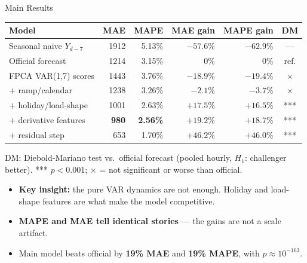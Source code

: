 \documentclass[10pt,aspectratio=169]{beamer}
\begin{document}

\begin{frame}{Main Results}

  \begin{center}
  \small
  \begin{tabular}{p{}rrrrc}
    \toprule
    Model & MAE & MAPE & MAE gain & MAPE gain & DM \\
    \midrule
    Seasonal naive $Y_{d-7}$ & 1912 & 5.13\% & $-57.6\%$ & $-62.9\%$ & --- \\
    Official forecast          & 1214 & 3.15\% & 0\%       & 0\%       & ref. \\
    \midrule
    FPCA VAR(1,7) scores       & 1443 & 3.76\% & $-18.9\%$ & $-19.4\%$ & $\times$ \\
    $+$ ramp/calendar          & 1238 & 3.26\% & $-2.1\%$  & $-3.7\%$  & $\times$ \\
    $+$ holiday/load-shape     & 1001 & 2.63\% & $+17.5\%$ & $+16.5\%$ & *** \\
    $+$ derivative features    & \textbf{980}  & \textbf{2.56\%} &
                                 $+19.2\%$ & $+18.7\%$ & *** \\
    \midrule
    $+$ residual step          & 653 & 1.70\% & $+46.2\%$ & $+46.0\%$ & *** \\
    \bottomrule
  \end{tabular}
  \end{center}

  \vspace{0.3em}
  \footnotesize
  DM: Diebold-Mariano test vs.\ official forecast (pooled hourly, $H_1$: challenger better).
  *** $p < 0.001$; $\times$ = not significant or worse than official.

  \vspace{0.3em}
  \begin{itemize}
    \item \textbf{Key insight:} the pure VAR dynamics are not enough.
      Holiday and load-shape features are what make the model competitive.
    \item \textbf{MAPE and MAE tell identical stories} --- the gains are
      not a scale artifact.
    \item Main model beats official by \textbf{19\% MAE} and \textbf{19\% MAPE},
      with $p \approx 10^{-163}$.
  \end{itemize}
\end{frame}
\end{document}
